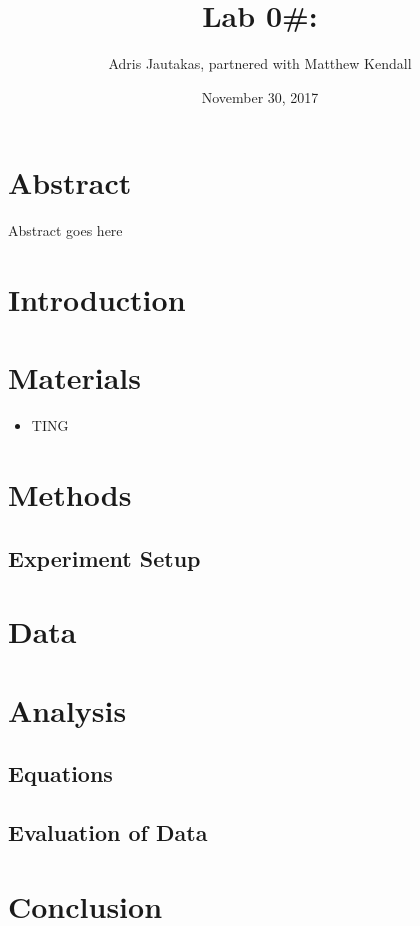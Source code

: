 \documentclass[12pt]{article}
\title{Lab 0#: }
\author{Adris Jautakas, partnered with Matthew Kendall}
\date{November 30, 2017}
\begin{document}
   \maketitle

    \section*{Abstract}
        {\small 
            Abstract goes here
        }

    \section{Introduction}

    \section{Materials}
        \begin{itemize}
            \item TING
        \end{itemize}
    
    \section{Methods}
        \subsection{Experiment Setup}
    
    \section{Data}
    
    \section{Analysis}
        \subsection{Equations}
        \subsection{Evaluation of Data}
    
    \section{Conclusion}
        
\end{document}

